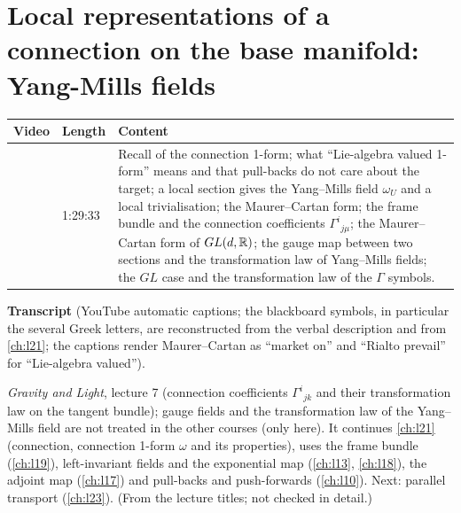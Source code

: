 \chapter{Local representations of a connection on the base manifold: Yang-Mills fields}\label{ch:l22}
\providecommand{\lact}{\mathbin{\triangleright}}
\providecommand{\ract}{\mathbin{\triangleleft}}
\begin{paracol}{2}

\begin{sources}
\begin{tabularx}{\linewidth}{@{}l l L@{}}
\toprule
\textbf{Video} & \textbf{Length} & \textbf{Content}\\
\midrule
{} & 1:29:33 & Recall of the connection 1-form; what ``Lie-algebra valued 1-form'' means and that pull-backs do not care about the target; a local section gives the Yang--Mills field $\omega_U$ and a local trivialisation; the Maurer--Cartan form; the frame bundle and the connection coefficients $\Gamma^i{}_{j\mu}$; the Maurer--Cartan form of $GL(d,\mathbb{R})$; the gauge map between two sections and the transformation law of Yang--Mills fields; the $GL$ case and the transformation law of the $\Gamma$ symbols.\\
\bottomrule
\end{tabularx}

\smallskip
\textbf{Transcript}  (YouTube automatic captions; the blackboard symbols, in particular the several Greek letters, are reconstructed from the verbal description and from \cref{ch:l21}; the captions render Maurer--Cartan as ``market on'' and ``Rialto prevail'' for ``Lie-algebra valued'').
\end{sources}

\begin{reading}
\emph{Gravity and Light}, lecture 7 (connection coefficients $\Gamma^i{}_{jk}$ and their transformation law on the tangent bundle); gauge fields and the transformation law of the Yang--Mills field are not treated in the other courses (only here). It continues \cref{ch:l21} (connection, connection 1-form $\omega$ and its properties), uses the frame bundle (\cref{ch:l19}), left-invariant fields and the exponential map (\cref{ch:l13}, \cref{ch:l18}), the adjoint map (\cref{ch:l17}) and pull-backs and push-forwards (\cref{ch:l10}). Next: parallel transport (\cref{ch:l23}). (From the lecture titles; not checked in detail.)
\end{reading}


\end{paracol}

